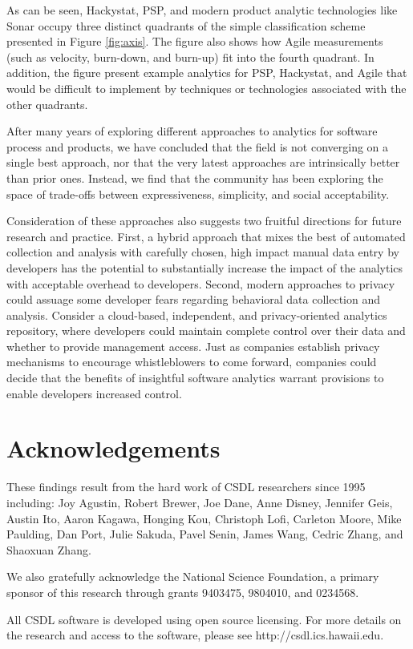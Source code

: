 \documentclass[]{article}
\begin{document}
As can be seen, Hackystat, PSP, and modern product analytic technologies like Sonar occupy
three distinct quadrants of the simple classification scheme presented in Figure
\ref{fig:axis}. The figure also shows how Agile measurements (such as velocity, burn-down,
and burn-up) fit into the fourth quadrant.  In addition, the figure present example analytics
for PSP, Hackystat, and Agile that would be difficult to implement by techniques or
technologies associated with the other quadrants.

After many years of exploring different approaches to analytics for software process and
products, we have concluded that the field is not converging on a single best approach,
nor that the very latest approaches are intrinsically better than prior ones.  Instead, we
find that the community has been exploring the space of trade-offs between expressiveness,
simplicity, and social acceptability.  

Consideration of these approaches also suggests two fruitful directions for future
research and practice.  First, a hybrid approach that mixes the best of automated
collection and analysis with carefully chosen, high impact manual data entry by developers
has the potential to substantially increase the impact of the analytics with acceptable
overhead to developers.  Second, modern approaches to privacy could assuage some developer
fears regarding behavioral data collection and analysis.  Consider a cloud-based,
independent, and privacy-oriented analytics repository, where developers could maintain
complete control over their data and whether to provide management access.  Just as
companies establish privacy mechanisms to encourage whistleblowers to come forward,
companies could decide that the benefits of insightful software analytics warrant
provisions to enable developers increased control. 

\section{Acknowledgements}

These findings result from the hard work of CSDL researchers since 1995 including:
Joy Agustin,  
Robert Brewer,
Joe Dane, 
Anne Disney, 
Jennifer Geis, 
Austin Ito, 
Aaron Kagawa,  
Honging Kou, 
Christoph Lofi, 
Carleton Moore, 
Mike Paulding, 
Dan Port,
Julie Sakuda,
Pavel Senin,
James Wang,
Cedric Zhang, and
Shaoxuan Zhang.

We also gratefully acknowledge the National Science Foundation, a primary sponsor of this
research through grants 9403475, 9804010, and 0234568.

All CSDL software is developed using open source licensing.  For more details on the
research and access to the software, please see http://csdl.ics.hawaii.edu.



\end{document}
